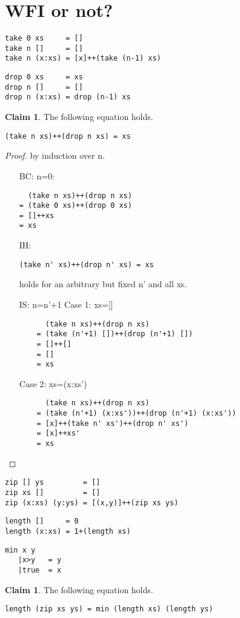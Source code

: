 \documentclass[]{article}
\theoremstyle{definition}
\newtheorem{claim}[theorem]{Claim}
\begin{document}
\section{WFI or not?}
\begin{verbatim}
take 0 xs     = []
take n []     = []
take n (x:xs) = [x]++(take (n-1) xs)
\end{verbatim}
\begin{verbatim}
drop 0 xs     = xs
drop n []     = []
drop n (x:xs) = drop (n-1) xs
\end{verbatim}
\begin{claim}The following equation holds.
\begin{verbatim}
(take n xs)++(drop n xs) = xs
\end{verbatim}
\end{claim}
\begin{proof} by induction over n.
\begin{itemize}
\item[BC:]n=0:
\begin{verbatim}
  (take n xs)++(drop n xs) 
= (take 0 xs)++(drop 0 xs)
= []++xs
= xs
\end{verbatim}
\item[IH:]
\begin{verbatim}
(take n' xs)++(drop n' xs) = xs
\end{verbatim}
holds for an arbitrary but fixed n' and all xs.
\item[IS:]n=n'+1
\subitem Case 1: xs=[]
\begin{verbatim}
	  (take n xs)++(drop n xs)
	= (take (n'+1) [])++(drop (n'+1) []) 
	= []++[]
	= []
	= xs
\end{verbatim}
\subitem Case 2: xs=(x:xs')
\begin{verbatim}
	  (take n xs)++(drop n xs)
	= (take (n'+1) (x:xs'))++(drop (n'+1) (x:xs'))
	= [x]++(take n' xs')++(drop n' xs')
	= [x]++xs'
	= xs
\end{verbatim}
\end{itemize}
\end{proof}
\newpage
\begin{verbatim}
zip [] ys         = []
zip xs []         = []
zip (x:xs) (y:ys) = [(x,y)]++(zip xs ys)
\end{verbatim}
\begin{verbatim}
length []     = 0
length (x:xs) = 1+(length xs)
\end{verbatim}
\begin{verbatim}
min x y
   |x>y   = y
   |true  = x
\end{verbatim}
\begin{claim}\label{minZip}The following equation holds.
\begin{verbatim}
length (zip xs ys) = min (length xs) (length ys)
\end{verbatim}
\end{claim}
\end{document}

